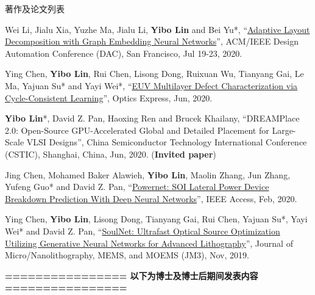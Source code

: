 \begin{rSection}{著作及论文列表}
\begin{description}[font=\normalfont, rightmargin=2em]
{}
            

\item[{[C57]}]{
        Wei Li, Jialu Xia, Yuzhe Ma, Jialu Li, \textbf{Yibo Lin} and Bei Yu*, 
    ``\href{https://doi.org/10.1109/DAC18072.2020.9218706}{Adaptive Layout Decomposition with Graph Embedding Neural Networks}'', 
    ACM/IEEE Design Automation Conference (DAC), San Francisco, Jul 19-23, 2020.
    
}
            

\item[{[J56]}]{
        Ying Chen, \textbf{Yibo Lin}, Rui Chen, Lisong Dong, Ruixuan Wu, Tianyang Gai, Le Ma, Yajuan Su* and Yayi Wei*, 
    ``\href{https://doi.org/10.1364/OE.394590}{EUV Multilayer Defect Characterization via Cycle-Consistent Learning}'', 
    Optics Express, Jun, 2020.
    
}
            

\item[{[C55]}]{
        \textbf{Yibo Lin}*, David Z. Pan, Haoxing Ren and Brucek Khailany, 
    ``DREAMPlace 2.0: Open-Source GPU-Accelerated Global and Detailed Placement for Large-Scale VLSI Designs'', 
    China Semiconductor Technology International Conference (CSTIC), Shanghai, China, Jun, 2020.
    (\textbf{Invited paper})
}
            

\item[{[J54]}]{
        Jing Chen, Mohamed Baker Alawieh, \textbf{Yibo Lin}, Maolin Zhang, Jun Zhang, Yufeng Guo* and David Z. Pan, 
    ``\href{https://doi.org/10.1109/ACCESS.2020.2970966}{Powernet: SOI Lateral Power Device Breakdown Prediction With Deep Neural Networks}'', 
    IEEE Access, Feb, 2020.
    
}
            

\item[{[J53]}]{
        Ying Chen, \textbf{Yibo Lin}, Lisong Dong, Tianyang Gai, Rui Chen, Yajuan Su*, Yayi Wei* and David Z. Pan, 
    ``\href{https://dx.doi.org/10.1117/1.JMM.18.4.043506}{SoulNet: Ultrafast Optical Source Optimization Utilizing Generative Neural Networks for Advanced Lithography}'', 
    Journal of Micro/Nanolithography, MEMS, and MOEMS (JM3), Nov, 2019.
    
}
            

\end{description}
    

\begin{description}[font=\normalfont, rightmargin=2em]
    \item \textbf{================ 以下为博士及博士后期间发表内容 ================}
\end{description}
        


\end{rSection}
